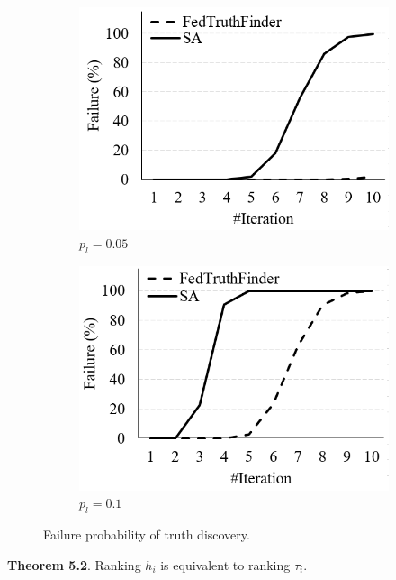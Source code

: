\begin{figure}
	\centering
		\begin{subfigure}[t]{.3\linewidth}
			\includegraphics[width=1\linewidth]{./fig/failure_cl0.05.PNG}
			\caption{$p_l=0.05$}
		\end{subfigure}
		\begin{subfigure}[t]{.3\linewidth}
			\includegraphics[width=1\linewidth]{./fig/failure_cl0.1.PNG}
			\caption{$p_l=0.1$}
		\end{subfigure}
		\caption{Failure probability of truth discovery.}
		\label{fig:failure}
\end{figure}

\vspace{+.5em}
\textbf{Theorem 5.2}. Ranking $h_i$ is equivalent to ranking $\tau_i$.



